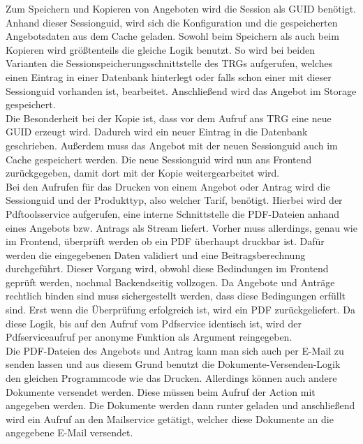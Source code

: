 Zum Speichern und Kopieren von Angeboten wird die Session als \ac{GUID} benötigt. Anhand dieser Sessionguid, wird sich die Konfiguration und die gespeicherten Angebotsdaten aus dem Cache geladen. Sowohl beim Speichern als auch beim Kopieren wird größtenteils die gleiche Logik benutzt. So wird bei beiden Varianten die Sessionspeicherungsschnittstelle des \ac{TRG}s aufgerufen, welches einen Eintrag in einer Datenbank hinterlegt oder falls schon einer mit dieser Sessionguid vorhanden ist, bearbeitet. Anschließend wird das Angebot im Storage gespeichert. \\
Die Besonderheit bei der Kopie ist, dass vor dem Aufruf ans \ac{TRG} eine neue \ac{GUID} erzeugt wird. Dadurch wird ein neuer Eintrag in die Datenbank geschrieben. Außerdem muss das Angebot mit der neuen Sessionguid auch im Cache gespeichert werden. Die neue Sessionguid wird nun ans Frontend zurückgegeben, damit dort mit der Kopie weitergearbeitet wird.\\
Bei den Aufrufen für das Drucken von einem Angebot oder Antrag wird die Sessionguid und der Produkttyp, also welcher Tarif, benötigt. Hierbei wird der Pdftoolsservice aufgerufen, eine interne Schnittstelle die PDF-Dateien anhand eines Angebots bzw. Antrags als Stream liefert. Vorher muss allerdings, genau wie im Frontend, überprüft werden ob ein PDF überhaupt druckbar ist. Dafür werden die eingegebenen Daten validiert und eine Beitragsberechnung durchgeführt. Dieser Vorgang wird, obwohl diese Bedindungen im Frontend geprüft werden, nochmal Backendseitig vollzogen. Da Angebote und Anträge rechtlich binden sind muss sichergestellt werden, dass diese Bedingungen erfüllt sind. Erst wenn die Überprüfung erfolgreich ist, wird ein PDF zurückgeliefert. Da diese Logik, bis auf den Aufruf vom Pdfservice identisch ist, wird der Pdfserviceaufruf per anonyme Funktion als Argument reingegeben.\\
Die PDF-Dateien des Angebots und Antrag kann man sich auch per E-Mail zu senden lassen und aus diesem Grund benutzt die Dokumente-Versenden-Logik den gleichen Programmcode wie das Drucken. Allerdings können auch andere Dokumente versendet werden. Diese müssen beim Aufruf der Action mit angegeben werden. Die Dokumente werden dann runter geladen und anschließend wird ein Aufruf an den Mailservice getätigt, welcher diese Dokumente an die angegebene E-Mail versendet.

